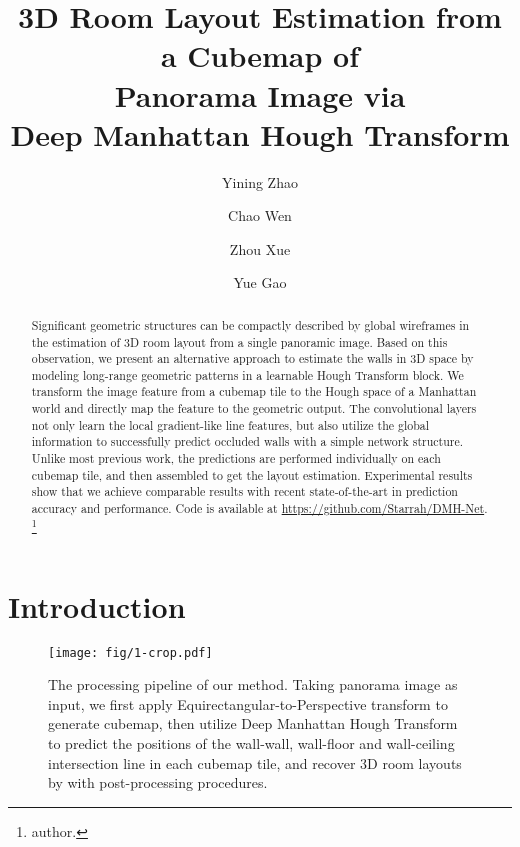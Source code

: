 \documentclass[runningheads]{llncs}
\newcommand\blfootnote[1]{\begingroup
  \renewcommand\thefootnote{}\footnote{#1}\addtocounter{footnote}{-1}\endgroup
}
\begin{document}
\pagestyle{headings}
\mainmatter
\def\ECCVSubNumber{3606}  

\title{3D Room Layout Estimation from a Cubemap of\\ Panorama Image via\\ Deep Manhattan Hough Transform} 



\author{Yining Zhao \and
Chao Wen \and
Zhou Xue \and
Yue Gao}

\maketitle

\begin{abstract}
   Significant geometric structures can be compactly described by global wireframes in the estimation of 3D room layout from a single panoramic image. Based on this observation, we present an alternative approach to estimate the walls in 3D space by modeling long-range geometric patterns in a learnable Hough Transform block. We transform the image feature from a cubemap tile to the Hough space of a Manhattan world and directly map the feature to the geometric output. The convolutional layers not only learn the local gradient-like line features, but also utilize the global information to successfully predict occluded walls with a simple network structure. Unlike most previous work, the predictions are performed individually on each cubemap tile, and then assembled to get the layout estimation. Experimental results show that we achieve comparable results with recent state-of-the-art in prediction accuracy and performance.
   Code is available at \url{https://github.com/Starrah/DMH-Net}.\blfootnote{\noindentCorresponding author.}


\end{abstract}
\normalem
\section{Introduction}
\label{sec:intro}

\begin{figure*}[!h]
	\centering
	\texttt{[image: fig/1-crop.pdf]}
	\caption{The processing pipeline of our method. Taking panorama image as input, we first apply Equirectangular-to-Perspective transform to generate cubemap, then utilize Deep Manhattan Hough Transform to predict the positions of the wall-wall, wall-floor and wall-ceiling intersection line in each cubemap tile, and recover 3D room layouts by with post-processing procedures.
	}
	\label{fig:pipeline} 
\end{figure*}
\end{document}
